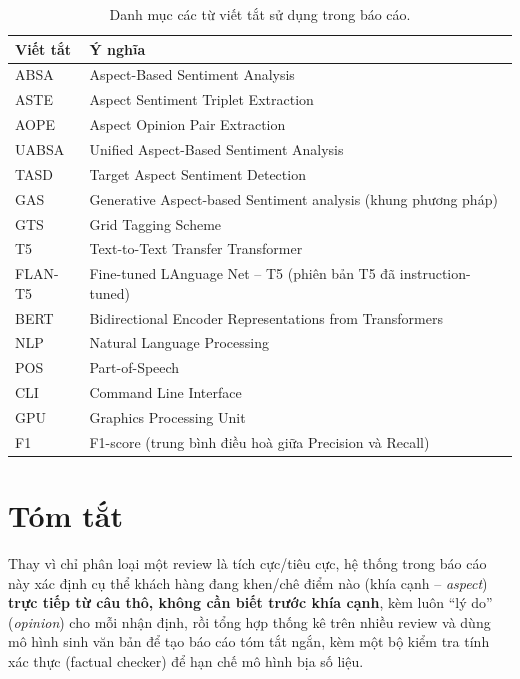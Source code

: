 \documentclass[11pt,a4paper]{article}
\begin{document}
\begin{table}[h]
\centering
\begin{tabular}{ll}
\toprule
Viết tắt & Ý nghĩa \\
\midrule
ABSA & Aspect-Based Sentiment Analysis \\
ASTE & Aspect Sentiment Triplet Extraction \\
AOPE & Aspect Opinion Pair Extraction \\
UABSA & Unified Aspect-Based Sentiment Analysis \\
TASD & Target Aspect Sentiment Detection \\
GAS & Generative Aspect-based Sentiment analysis (khung phương pháp) \\
GTS & Grid Tagging Scheme \\
T5 & Text-to-Text Transfer Transformer \\
FLAN-T5 & Fine-tuned LAnguage Net -- T5 (phiên bản T5 đã instruction-tuned) \\
BERT & Bidirectional Encoder Representations from Transformers \\
NLP & Natural Language Processing \\
POS & Part-of-Speech \\
CLI & Command Line Interface \\
GPU & Graphics Processing Unit \\
F1 & F1-score (trung bình điều hoà giữa Precision và Recall) \\
\bottomrule
\end{tabular}
\caption{Danh mục các từ viết tắt sử dụng trong báo cáo.}
\end{table}

\clearpage
\section*{Tóm tắt}

Thay vì chỉ phân loại một review là tích cực/tiêu cực, hệ thống trong báo cáo này
xác định cụ thể khách hàng đang khen/chê điểm nào (khía cạnh -- \emph{aspect})
\textbf{trực tiếp từ câu thô, không cần biết trước khía cạnh}, kèm luôn ``lý do''
(\emph{opinion}) cho mỗi nhận định, rồi tổng hợp thống kê trên nhiều review và
dùng mô hình sinh văn bản để tạo báo cáo tóm tắt ngắn, kèm một bộ kiểm tra tính
xác thực (factual checker) để hạn chế mô hình bịa số liệu.
\end{document}

